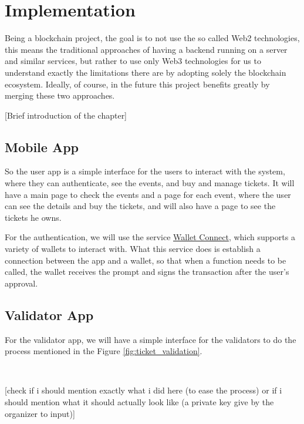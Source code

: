 \chapter{Implementation}
\label{ch:implementation}

Being a blockchain project, the goal is to not use the so called Web2
technologies, this means the traditional approaches of having a backend running
on a server and similar services, but rather to use only Web3 technologies for
us to understand exactly the limitations there are by adopting solely the
blockchain ecosystem. Ideally, of course, in the future this project benefits
greatly by merging these two approaches.

[Brief introduction of the chapter]

\section{Mobile App}
\label{sec:mobile_app}

% 
% 

So the user app is a simple interface for the users to interact with the
system, where they can authenticate, see the events, and buy and manage
tickets. It will have a main page to check the events and a page for each
event, where the user can see the details and buy the tickets, and will also
have a page to see the tickets he owns.

For the authentication, we will use the service
\href{https://walletconnect.com/}{Wallet Connect}, which supports a variety of
wallets to interact with. What this service does is establish a connection
between the app and a wallet, so that when a function needs to be called, the
wallet receives the prompt and signs the transaction after the user's approval.

\section{Validator App}
\label{sec:validator_app}

For the validator app, we will have a simple interface for the validators to do
the process mentioned in the Figure \ref{fig:ticket_validation}.

~

[check if i should mention exactly what i did here (to ease the process) or if i should mention what it should actually look like (a private key give by the organizer to input)]

